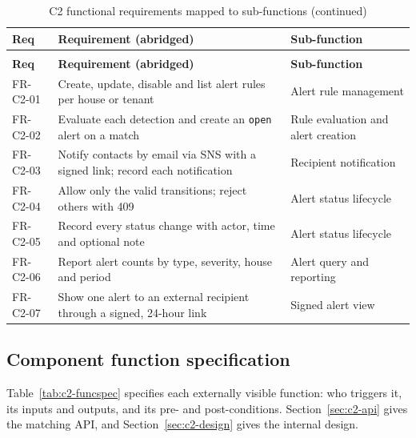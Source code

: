 \begin{longtable}{L{2.2cm}L{8.6cm}L{3.8cm}}
\caption{C2 functional requirements mapped to sub-functions}\label{tab:c2-fr}\\
\toprule
\textbf{Req} & \textbf{Requirement (abridged)} & \textbf{Sub-function} \\
\midrule
\endfirsthead
\caption[]{C2 functional requirements mapped to sub-functions (continued)}\\
\toprule
\textbf{Req} & \textbf{Requirement (abridged)} & \textbf{Sub-function} \\
\midrule
\endhead
FR-C2-01 & Create, update, disable and list alert rules per house or tenant & Alert rule management \\
FR-C2-02 & Evaluate each detection and create an \texttt{open} alert on a match & Rule evaluation and alert creation \\
FR-C2-03 & Notify contacts by email via SNS with a signed link; record each notification & Recipient notification \\
FR-C2-04 & Allow only the valid transitions; reject others with 409 & Alert status lifecycle \\
FR-C2-05 & Record every status change with actor, time and optional note & Alert status lifecycle \\
FR-C2-06 & Report alert counts by type, severity, house and period & Alert query and reporting \\
FR-C2-07 & Show one alert to an external recipient through a signed, 24-hour link & Signed alert view \\
\bottomrule
\end{longtable}

\subsection{Component function specification}
Table~\ref{tab:c2-funcspec} specifies each externally visible function: who triggers it, its inputs and
outputs, and its pre- and post-conditions. Section~\ref{sec:c2-api} gives the matching API, and
Section~\ref{sec:c2-design} gives the internal design.


